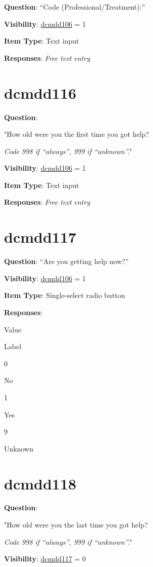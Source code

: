 \documentclass[
]{book}
\begin{document}
\textbf{Question}: ``Code (Professional/Treatment):''

\textbf{Visibility}: \protect\hyperlink{dcmdd106}{dcmdd106} = 1

\textbf{Item Type}: Text input

\textbf{Responses}: \emph{Free text entry}

\hypertarget{dcmdd116}{%
\section{dcmdd116}\label{dcmdd116}}

\textbf{Question}:

"How old were you the first time you got help?

\emph{Code 998 if ``always'', 999 if ``unknown''.}"

\textbf{Visibility}: \protect\hyperlink{dcmdd106}{dcmdd106} = 1

\textbf{Item Type}: Text input

\textbf{Responses}: \emph{Free text entry}

\hypertarget{dcmdd117}{%
\section{dcmdd117}\label{dcmdd117}}

\textbf{Question}: ``Are you getting help now?''

\textbf{Visibility}: \protect\hyperlink{dcmdd106}{dcmdd106} = 1

\textbf{Item Type}: Single-select radio button

\textbf{Responses}:

Value

Label

0

No

1

Yes

9

Unknown

\hypertarget{dcmdd118}{%
\section{dcmdd118}\label{dcmdd118}}

\textbf{Question}:

"How old were you the last time you got help?

\emph{Code 998 if ``always'', 999 if ``unknown''.}"

\textbf{Visibility}: \protect\hyperlink{dcmdd117}{dcmdd117} = 0
\end{document}
